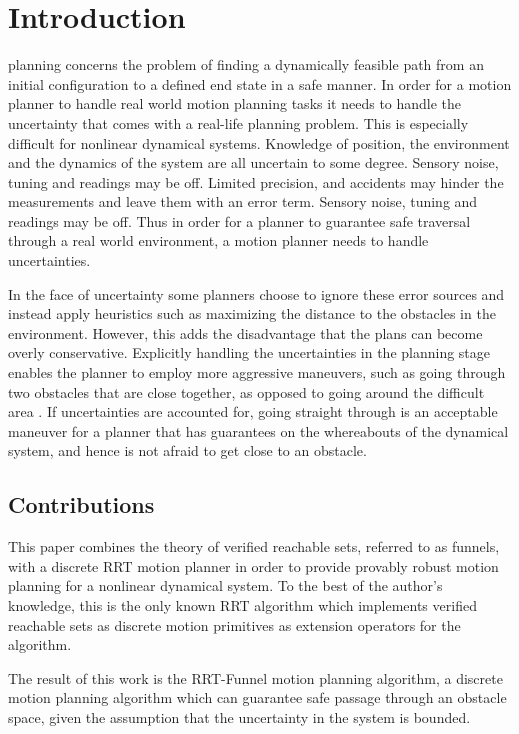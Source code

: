 
\section{Introduction}
 planning concerns the problem of finding a dynamically
feasible path from an initial configuration to a defined end state in a safe
manner. In order for a motion planner to handle real world motion planning tasks
it needs to handle the uncertainty that comes with a real-life planning problem.
This is especially difficult for nonlinear dynamical systems. Knowledge of
position, the environment and the dynamics of the system are all uncertain to
some degree. Sensory noise, tuning and readings may be off. Limited precision,
and accidents may hinder the measurements and leave them with an error term.
Sensory noise, tuning and readings may be off. Thus in order for a planner to
guarantee safe traversal through a real world environment, a motion planner
needs to handle uncertainties.

In the face of uncertainty some planners choose to ignore these error sources
and instead apply heuristics such as maximizing the distance to the obstacles in
the environment. However, this adds the disadvantage that the plans can become
overly conservative. Explicitly handling the uncertainties in the planning stage
enables the planner to employ more aggressive maneuvers, such as going through
two obstacles that are close together, as opposed to going around the difficult
area . If uncertainties are accounted for, going straight through is an
acceptable maneuver for a planner that has guarantees on the whereabouts of the
dynamical system, and hence is not afraid to get close to an obstacle.

\subsection{Contributions}

This paper combines the theory of verified reachable sets, referred to as
funnels, with a discrete RRT motion planner in order to provide provably robust
motion planning for a nonlinear dynamical system. To the best of the author's
knowledge, this is the only known RRT algorithm which implements verified
reachable sets as discrete motion primitives as extension operators for the
algorithm.

The result of this work is the RRT-Funnel motion planning algorithm, a discrete
motion planning algorithm which can guarantee safe passage through an obstacle
space, given the assumption that the uncertainty in the system is bounded.

